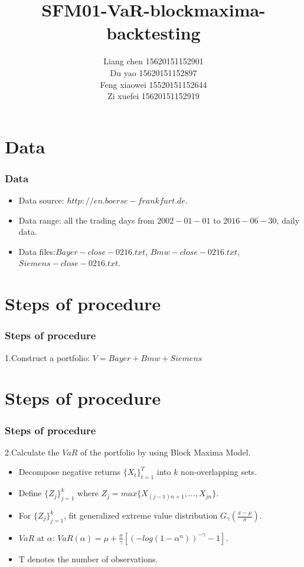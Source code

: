 \documentclass[12pt]{beamer}
\title{SFM01-VaR-blockmaxima-backtesting}
\author[]{Liang chen 15620151152901\\Du yao 15620151152897\\Feng xiaowei 15520151152644\\Zi xuefei 15620151152919} %
\institute[]{
	\textsl{July 13th,2016}
}
\date[July 13$^{th}, 2016$]{} %
\begin{document}
	
\begin{frame}
	\titlepage
\end{frame}


\section{Data}
\begin{frame}
	\frametitle{Data}
	\begin{itemize}
		\item Data source: $http://en.boerse-frankfurt.de$.
		\item Data range: all the trading days from $2002-01-01$ to $2016-06-30$, daily data.
		\item Data files:$Bayer-close-0216.txt$, $Bmw-close-0216.txt$, $Siemens-close-0216.txt$.
	\end{itemize}
\end{frame}


\section{Steps of procedure}
\begin{frame}
	\frametitle{Steps of procedure}
		1.Construct a portfolio: $V=Bayer+Bmw+Siemens$
\end{frame}


\section{Steps of procedure}

\begin{frame}
	\frametitle{Steps of procedure}
        2.Calculate the $VaR$ of the portfolio by using Block Maxima Model.
	\begin{itemize}
		\item Decompose negative returns $\{X_t\}_{t=1}^T$ into $k$ non-overlapping sets.
		\item Define $\{Z_j\}_{j=1}^k$ where $Z_j=max\{X_{(j-1)n+1},...,X_{jn}\}$.
		\item For $\{Z_j\}_{j=1}^k$, fit generalized extreme value distribution $G_{\gamma}(\frac{x-\mu}{\sigma})$.
        \item $VaR$ at $\alpha$: $VaR(\alpha)=\mu+\frac{\sigma}{\gamma}[(-log(1-\alpha^n))^{-\gamma}-1]$.
        \item T denotes the number of observations.
	\end{itemize}
\end{frame}
\end{document}
